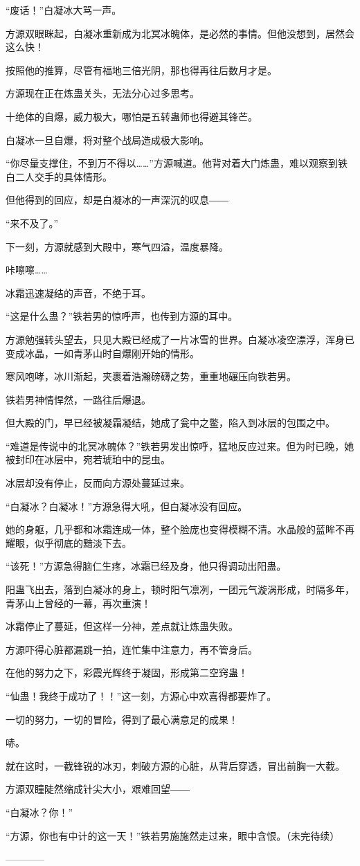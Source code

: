 \begin{this_body}
“废话！”白凝冰大骂一声。

方源双眼眯起，白凝冰重新成为北冥冰魄体，是必然的事情。但他没想到，居然会这么快！

按照他的推算，尽管有福地三倍光阴，那也得再往后数月才是。

方源现在正在炼蛊关头，无法分心过多思考。

十绝体的自爆，威力极大，哪怕是五转蛊师也得避其锋芒。

白凝冰一旦自爆，将对整个战局造成极大影响。

“你尽量支撑住，不到万不得以……”方源喊道。他背对着大门炼蛊，难以观察到铁白二人交手的具体情形。

但他得到的回应，却是白凝冰的一声深沉的叹息――

“来不及了。”

下一刻，方源就感到大殿中，寒气四溢，温度暴降。

咔嚓嚓……

冰霜迅速凝结的声音，不绝于耳。

“这是什么蛊？”铁若男的惊呼声，也传到方源的耳中。

方源勉强转头望去，只见大殿已经成了一片冰雪的世界。白凝冰凌空漂浮，浑身已变成冰晶，一如青茅山时自爆刚开始的情形。

寒风咆哮，冰川渐起，夹裹着浩瀚磅礴之势，重重地碾压向铁若男。

铁若男神情悍然，一路往后爆退。

但大殿的门，早已经被凝霜凝结，她成了瓮中之鳖，陷入到冰层的包围之中。

“难道是传说中的北冥冰魄体？”铁若男发出惊呼，猛地反应过来。但为时已晚，她被封印在冰层中，宛若琥珀中的昆虫。

冰层却没有停止，反而向方源处蔓延过来。

“白凝冰？白凝冰！”方源急得大吼，但白凝冰没有回应。

她的身躯，几乎都和冰霜连成一体，整个脸庞也变得模糊不清。水晶般的蓝眸不再耀眼，似乎彻底的黯淡下去。

“该死！”方源急得脑仁生疼，冰霜已经及身，他只得调动出阳蛊。

阳蛊飞出去，落到白凝冰的身上，顿时阳气凛冽，一团元气漩涡形成，时隔多年，青茅山上曾经的一幕，再次重演！

冰霜停止了蔓延，但这样一分神，差点就让炼蛊失败。

方源吓得心脏都漏跳一拍，连忙集中注意力，再不管身后。

在他的努力之下，彩霞光辉终于凝固，形成第二空窍蛊！

“仙蛊！我终于成功了！！”这一刻，方源心中欢喜得都要炸了。

一切的努力，一切的冒险，得到了最心满意足的成果！

哧。

就在这时，一截锋锐的冰刃，刺破方源的心脏，从背后穿透，冒出前胸一大截。

方源双瞳陡然缩成针尖大小，艰难回望――

“白凝冰？你！”

“方源，你也有中计的这一天！”铁若男施施然走过来，眼中含恨。（未完待续）

------------

\end{this_body}

